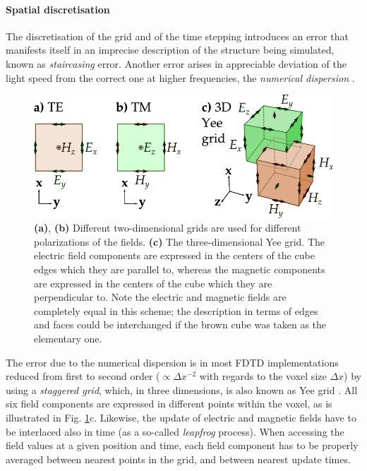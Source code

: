 \paragraph{Spatial discretisation} %
The discretisation of the grid and of the time stepping introduces an error that manifests itself in an imprecise description of the structure being simulated, known as \textit{staircasing} error. Another error arises in appreciable deviation of the light speed from the correct one at higher frequencies, the \textit{numerical dispersion} \cite{taflove2005book}.
\begin{figure}[ht] \caption{\textbf{(a)}, \textbf{(b)} Different two-dimensional grids are used for different polarizations of the fields. \textbf{(c)} The three-dimensional Yee grid. The electric field components are expressed in the centers of the cube edges which they are parallel to, whereas the magnetic components are expressed in the centers of the cube which they are perpendicular to. Note the electric and magnetic fields are completely equal in this scheme; the description in terms of edges and faces could be interchanged if the brown cube was taken as the elementary one.} \label{fg_fdtd_yee} \centering 
	\includegraphics[width=12cm]{img/FDTD_Yee_grid_2d-3d.pdf}
\end{figure}

The error due to the numerical dispersion is in most FDTD implementations reduced from first to second order ($\propto \Delta x^{-2}$ with regards to the voxel size $\Delta x$) by using a \textit{staggered grid}, which, in three dimensions, is also known as Yee grid \cite{yee1966numerical}. All six field components are expressed in different points within the voxel, as is illustrated in Fig. \ref{fg_fdtd_yee}c.
Likewise, the update of electric and magnetic fields have to be interlaced also in time (as a so-called \textit{leapfrog} process). When accessing the field values at a given position and time, each field component has to be properly averaged between nearest points in the grid, and between nearest update times.  %

